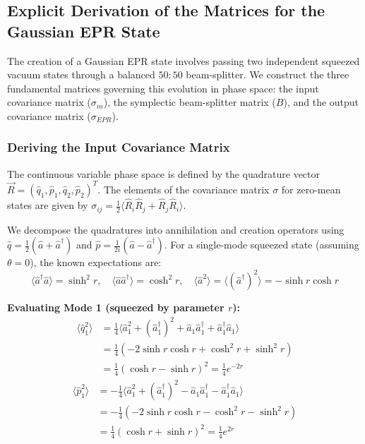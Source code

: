 \subsection{Explicit Derivation of the Matrices for the Gaussian EPR State}

The creation of a Gaussian EPR state involves passing two independent squeezed vacuum states through a balanced $50{:}50$ beam-splitter. We construct the three fundamental matrices governing this evolution in phase space: the input covariance matrix ($\sigma_{in}$), the symplectic beam-splitter matrix ($B$), and the output covariance matrix ($\sigma_{EPR}$). 

\subsubsection{Deriving the Input Covariance Matrix }
The continuous variable phase space is defined by the quadrature vector $\vec{R} = (\hat{q}_1, \hat{p}_1, \hat{q}_2, \hat{p}_2)^T$. The elements of the covariance matrix $\sigma$ for zero-mean states are given by $\sigma_{ij} = \frac{1}{2}\langle \hat{R}_i\hat{R}_j + \hat{R}_j\hat{R}_i \rangle$. 

We decompose the quadratures into annihilation and creation operators using $\hat{q} = \frac{1}{2}(\hat{a} + \hat{a}^\dagger)$ and $\hat{p} = \frac{1}{2i}(\hat{a} - \hat{a}^\dagger)$.
For a single-mode squeezed state (assuming $\theta = 0$), the known expectations are:
\begin{equation*}
\langle \hat{a}^\dagger\hat{a} \rangle = \sinh^2 r, \quad \langle \hat{a}\hat{a}^\dagger \rangle = \cosh^2 r, \quad \langle \hat{a}^2 \rangle = \langle (\hat{a}^\dagger)^2 \rangle = -\sinh r \cosh r
\end{equation*}

\textbf{Evaluating Mode 1 (squeezed by parameter $r$):}
\begin{align*}
\langle\hat{q}_1^2\rangle &= \frac{1}{4} \langle \hat{a}_1^2 + (\hat{a}_1^\dagger)^2 + \hat{a}_1\hat{a}_1^\dagger + \hat{a}_1^\dagger\hat{a}_1 \rangle \\
&= \frac{1}{4} \left( -2\sinh r \cosh r + \cosh^2 r + \sinh^2 r \right) \\
&= \frac{1}{4} (\cosh r - \sinh r)^2 = \frac{1}{4}e^{-2r}
\end{align*}
\begin{align*}
\langle\hat{p}_1^2\rangle &= -\frac{1}{4} \langle \hat{a}_1^2 + (\hat{a}_1^\dagger)^2 - \hat{a}_1\hat{a}_1^\dagger - \hat{a}_1^\dagger\hat{a}_1 \rangle \\
&= -\frac{1}{4} \left( -2\sinh r \cosh r - \cosh^2 r - \sinh^2 r \right) \\
&= \frac{1}{4} (\cosh r + \sinh r)^2 = \frac{1}{4}e^{2r}
\end{align*}

